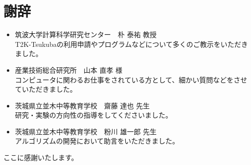 \section{謝辞}
\begin{itemize}
	\item 筑波大学計算科学研究センター　朴 泰祐 教授	\\
		T2K-Tsukubaの利用申請やプログラムなどについて多くのご教示をいただきました。 

	\item 産業技術総合研究所　山本 直孝 様	\\
		コンピュータに関わるお仕事をされている方として、細かい質問などをさせていただきました。

	\item 茨城県立並木中等教育学校　齋藤 達也 先生	\\
		研究・実験の方向性の指導をしてくださいました。

	\item 茨城県立並木中等教育学校　粉川 雄一郎 先生	\\
		アルゴリズムの開発において助言をいただきました。
\end{itemize}
ここに感謝いたします。
